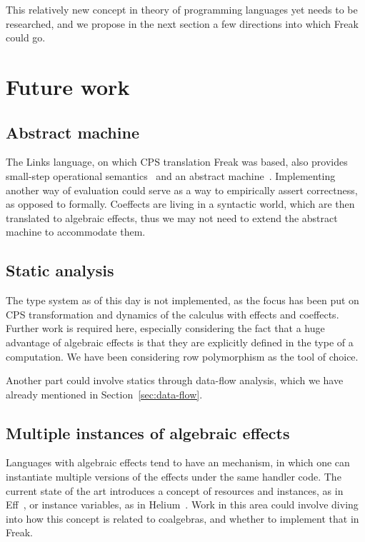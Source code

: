 \documentclass[declaration,shortabstract]{iithesis}
\theoremstyle{definition} \newtheorem{definition}{Definition}[chapter]
\theoremstyle{remark} \newtheorem{remark}[definition]{Observation}
\theoremstyle{plain} \newtheorem{theorem}[definition]{Theorem}
\theoremstyle{plain} \newtheorem{lemma}[definition]{Lemma}
\begin{document}
    This relatively new concept in theory of programming languages yet needs to
    be researched, and we propose in the next section a few directions into
    which Freak could go.

\section{Future work}

    \subsection{Abstract machine}

    The Links language, on which CPS translation Freak was based, also provides
    small-step operational semantics~\cite{handlers-cps} and an abstract
    machine~\cite{liberating-effects}. Implementing another way of evaluation
    could serve as a way to empirically assert correctness, as opposed to formally.
    Coeffects are living in a syntactic world, which are then translated to
    algebraic effects, thus we may not need to extend the abstract machine to
    accommodate them.

    \subsection{Static analysis}

    The type system as of this day is not implemented, as the focus has been put
    on CPS transformation and dynamics of the calculus with effects and coeffects.
    Further work is required here, especially considering the fact that a huge
    advantage of algebraic effects is that they are explicitly defined in the
    type of a computation. We have been considering row polymorphism as the
    tool of choice.

    Another part could involve statics through data-flow analysis, which we
    have already mentioned in Section~\ref{sec:data-flow}.

    \subsection{Multiple instances of algebraic effects}

    Languages with algebraic effects tend to have an mechanism, in which one
    can instantiate multiple versions of the effects under the same handler
    code. The current state of the art introduces a concept of resources and
    instances, as in Eff~\cite{programming-in-eff}, or instance variables, as
    in Helium~\cite{binders-labels}. Work in this area could involve diving
    into how this concept is related to coalgebras, and whether to implement
    that in Freak.
\end{document}
